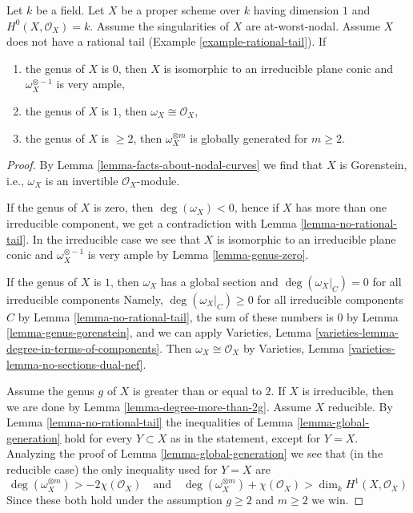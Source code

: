 \begin{lemma}
\label{lemma-no-rational-tail-semiample-genus-geq-2}
Let $k$ be a field. Let $X$ be a proper scheme over $k$ having dimension $1$
and $H^0(X, \mathcal{O}_X) = k$. Assume the singularities of $X$ are
at-worst-nodal. Assume $X$ does not have a rational tail
(Example \ref{example-rational-tail}). If
\begin{enumerate}
\item the genus of $X$ is $0$, then $X$ is isomorphic to an
irreducible plane conic and $\omega_X^{\otimes -1}$ is very ample,
\item the genus of $X$ is $1$, then $\omega_X \cong \mathcal{O}_X$,
\item the genus of $X$ is $\geq 2$, then
$\omega_X^{\otimes m}$ is globally generated for $m \geq 2$.
\end{enumerate}
\end{lemma}

\begin{proof}
By Lemma \ref{lemma-facts-about-nodal-curves} we find that $X$ is
Gorenstein, i.e., $\omega_X$ is an invertible $\mathcal{O}_X$-module.

\medskip\noindent
If the genus of $X$ is zero, then $\deg(\omega_X) < 0$, hence if
$X$ has more than one irreducible component, we get a contradiction
with Lemma \ref{lemma-no-rational-tail}. In the irreducible case
we see that $X$ is isomorphic to an irreducible plane conic and
$\omega_X^{\otimes -1}$ is very ample by Lemma \ref{lemma-genus-zero}.

\medskip\noindent
If the genus of $X$ is $1$, then $\omega_X$ has a global section and
$\deg(\omega_X|_C) = 0$ for all irreducible components
Namely, $\deg(\omega_X|_C) \geq 0$ for all irreducible components $C$
by Lemma \ref{lemma-no-rational-tail}, the sum of these numbers is
$0$ by Lemma \ref{lemma-genus-gorenstein}, and we can apply
Varieties, Lemma \ref{varieties-lemma-degree-in-terms-of-components}.
Then $\omega_X \cong \mathcal{O}_X$ by
Varieties, Lemma \ref{varieties-lemma-no-sections-dual-nef}.

\medskip\noindent
Assume the genus $g$ of $X$ is greater than or equal to $2$.
If $X$ is irreducible, then we are done by
Lemma \ref{lemma-degree-more-than-2g}.
Assume $X$ reducible.
By Lemma \ref{lemma-no-rational-tail} the
inequalities of Lemma \ref{lemma-global-generation}
hold for every $Y \subset X$ as in the statement, except for
$Y = X$. Analyzing the proof of Lemma \ref{lemma-global-generation}
we see that (in the reducible case) the only inequality
used for $Y = X$ are
$$
\deg(\omega_X^{\otimes m}) > -2 \chi(\mathcal{O}_X)
\quad\text{and}\quad
\deg(\omega_X^{\otimes m}) + \chi(\mathcal{O}_X) > \dim_k H^1(X, \mathcal{O}_X)
$$
Since these both hold under the assumption $g \geq 2$ and $m \geq 2$ we win.
\end{proof}

